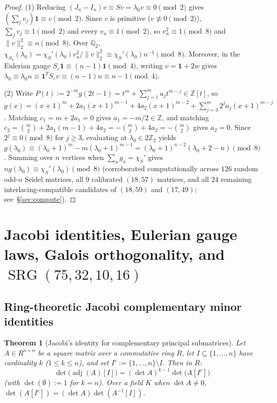 \documentclass[11pt,reqno]{amsart}
\newtheorem{theorem}{Theorem}[section]
\theoremstyle{definition}
\theoremstyle{remark}
\numberwithin{equation}{section}
\numberwithin{table}{section}
\DeclareMathOperator{\adj}{adj}
\DeclareMathOperator{\SRG}{SRG}
\begin{document}
\begin{proof}
(1) Reducing $(J_n - I_n)v \equiv S v = \lambda_0 v \equiv 0 \pmod 2$ gives $(\sum_j v_j)\mathbf{1} \equiv v \pmod 2$. Since $v$ is primitive ($v \not\equiv 0 \pmod 2$), $\sum_j v_j \equiv 1 \pmod 2$ and every $v_u \equiv 1 \pmod 2$, so $v_u^2 \equiv 1 \pmod 8$ and $\|v\|_2^2 \equiv n \pmod 8$. Over $\mathbb{Q}_2$, $\chi_{S_u}(\lambda_0) = \chi_S'(\lambda_0) v_u^2 / \|v\|_2^2 \equiv \chi_S'(\lambda_0) n^{-1} \pmod 8$. Moreover, in the Eulerian gauge $S_\varepsilon \mathbf{1} \equiv (n-1)\mathbf{1} \pmod 4$, writing $v = \mathbf{1} + 2w$ gives $\lambda_0 \equiv \lambda_0 n \equiv \mathbf{1}^T S_\varepsilon v \equiv (n-1)n \equiv n - 1 \pmod 4$.

(2) Write $P(t) := 2^{-m} g(2t - 1) = t^m + \sum_{j=1}^m a_j t^{m - j} \in \mathbb{Z}[t]$, so $g(x) = (x+1)^m + 2a_1(x+1)^{m-1} + 4a_2(x+1)^{m-2} + \sum_{j=3}^m 2^j a_j (x+1)^{m-j}$. Matching $c_1 = m + 2a_1 = 0$ gives $a_1 = -m/2 \in \mathbb{Z}$, and matching $c_2 = \binom{m}{2} + 2a_1(m - 1) + 4a_2 = -\binom{m}{2} + 4a_2 = -\binom{m}{2}$ gives $a_2 = 0$. Since $2^j \equiv 0 \pmod 8$ for $j \ge 3$, evaluating at $\lambda_0 \in 2\mathbb{Z}_2$ yields $g(\lambda_0) \equiv (\lambda_0 + 1)^m - m(\lambda_0 + 1)^{m-1} = (\lambda_0 + 1)^{n-2}(\lambda_0 + 2 - n) \pmod 8$. Summing over $n$ vertices when $\sum_u g_u = \chi_S'$ gives $n g(\lambda_0) \equiv \chi_S'(\lambda_0) \pmod 8$ (corroborated computationally across $126$ random odd-$n$ Seidel matrices, all $9$ calibrated $(18,57)$ matrices, and all $24$ remaining interlacing-compatible candidates of $(18,59)$ and $(17,49)$; see~\S\ref{sec:compute}).
\end{proof}

\section{Jacobi identities, Eulerian gauge laws, Galois orthogonality, and \texorpdfstring{$\SRG(75,32,10,16)$}{SRG(75,32,10,16)}}\label{sec:jacobi_galois}

\subsection{Ring-theoretic Jacobi complementary minor identities}
\begin{theorem}[Jacobi's identity for complementary principal submatrices]\label{thm:jacobi_ring}
Let $A \in R^{n \times n}$ be a square matrix over a commutative ring $R$, let $I \subseteq \{1, \dots, n\}$ have cardinality $k$ ($1 \le k \le n$), and set $I^c := \{1, \dots, n\} \setminus I$. Then in $R$:
\begin{equation}\label{eq:jacobi_ring}
  \det\!\big(\adj(A)[I]\big) = (\det A)^{k - 1} \det\!\big(A[I^c]\big)
\end{equation}
(with $\det(\emptyset) := 1$ for $k = n$). Over a field $K$ when $\det A \neq 0$, $\det(A[I^c]) = (\det A)\det(A^{-1}[I])$.
\end{theorem}
\end{document}
